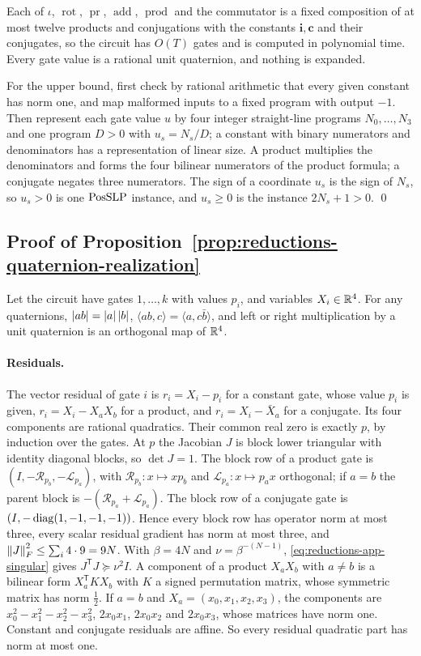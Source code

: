 Each of $\iota$, $\operatorname{rot}$, $\operatorname{pr}$, $\operatorname{add}$, $\operatorname{prod}$ and the commutator is a fixed composition of at
most twelve products and conjugations with the constants $\mathbf i,\mathbf c$
and their conjugates, so the circuit has $O(T)$ gates and is computed in
polynomial time. Every gate value is a rational unit quaternion, and nothing
is expanded.

For the upper bound, first check by rational arithmetic that every given
constant has norm one, and map malformed inputs to a fixed program with output
$-1$. Then represent each gate value $u$ by four integer straight-line programs
$N_0,\ldots,N_3$ and one program $D>0$ with $u_s=N_s/D$; a constant with
binary numerators and denominators has a representation of linear size. A product multiplies
the denominators and forms the four bilinear numerators of the product formula;
a conjugate negates three numerators. The sign of a coordinate $u_s$ is the
sign of $N_s$, so $u_s>0$ is one $\mathrm{PosSLP}$ instance, and $u_s\ge0$ is the
instance $2N_s+1>0$. \qed

\subsection{Proof of Proposition~\ref{prop:reductions-quaternion-realization}}
\label{app:reductions-quaternion-realization}

Let the circuit have gates $1,\ldots,k$ with values $p_i$, and variables
$X_i\in\mathbb R^4$. For any quaternions, $\left\lvert ab\right\rvert=\left\lvert a\right\rvert\left\lvert b\right\rvert$,
$\langle ab,c\rangle=\langle a,c\bar b\rangle$, and left or right multiplication
by a unit quaternion is an orthogonal map of $\mathbb R^4$.

\paragraph{Residuals.}
The vector residual of gate $i$ is $r_i=X_i-p_i$ for a constant gate, whose value $p_i$ is given,
$r_i=X_i-X_aX_b$ for a product, and $r_i=X_i-\bar X_a$ for a conjugate. Its four
components are rational quadratics. Their common real zero is exactly $p$, by
induction over the gates. At $p$ the Jacobian $J$ is block lower triangular
with identity diagonal blocks, so $\det J=1$. The block row of a product gate
is $(I,-\mathcal R_{p_b},-\mathcal L_{p_a})$, with $\mathcal R_{p_b}\colon x\mapsto xp_b$ and
$\mathcal L_{p_a}\colon x\mapsto p_ax$ orthogonal; if $a=b$ the parent block is
$-(\mathcal R_{p_a}+\mathcal L_{p_a})$. The block row of a conjugate gate is
$(I,-\operatorname{diag}(1,-1,-1,-1))$. Hence every block row has operator norm at most three,
every scalar residual gradient has norm at most three, and
$\left\lVert J\right\rVert_F^2\le\sum_i4\cdot9=9N$. With $\beta=4N$ and $\nu=\beta^{-(N-1)}$,
\eqref{eq:reductions-app-singular} gives $J^{\mathsf T}J\succeq\nu^2I$. A
component of a product $X_aX_b$ with $a\ne b$ is a bilinear form
$X_a^{\mathsf T}KX_b$ with $K$ a signed permutation matrix, whose symmetric
matrix has norm $\frac12$. If $a=b$ and $X_a=(x_0,x_1,x_2,x_3)$, the components are
$x_0^2-x_1^2-x_2^2-x_3^2$, $2x_0x_1$, $2x_0x_2$ and $2x_0x_3$, whose matrices have norm one. Constant and
conjugate residuals are affine. So every residual quadratic part has norm at
most one.

